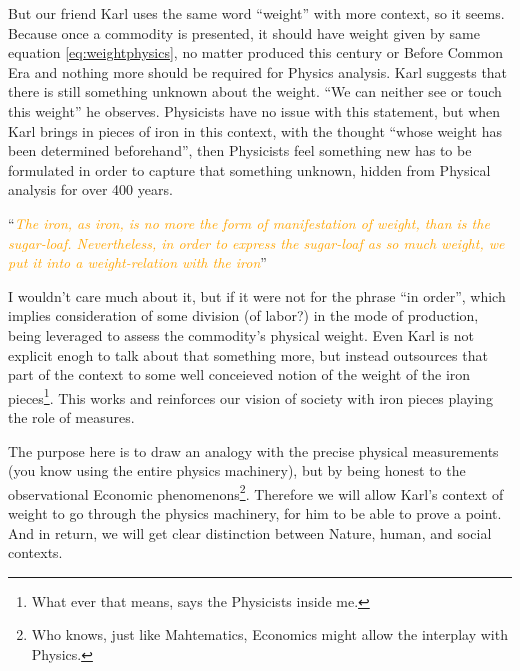 \documentclass[12pt]{extarticle}
\theoremstyle{definition}
\begin{document}
 But our friend Karl uses the same word ``weight'' with more context, so it seems.  Because once a commodity is presented, it should have weight given by same equation \ref{eq:weightphysics}, no matter produced this century or Before Common Era and nothing more should be required for Physics analysis.  Karl suggests that there is still something unknown about the weight.  ``We can neither see or touch this weight'' he observes.  Physicists have no issue with this statement, but when Karl brings in pieces of iron in this context, with the thought ``whose weight has been determined beforehand'', then Physicists feel something new has to be formulated in order to capture that something unknown, hidden from Physical analysis for over 400 years.

 ``\emph{\textcolor{orange}{The iron, as iron, is no more the form of manifestation of weight, than is the sugar-loaf. Nevertheless, in order to express the sugar-loaf as so much weight, we put it into a weight-relation with the iron}}''

 I wouldn't care much about it, but if it were not for the phrase ``in order'', which implies consideration of some division (of labor?) in the mode of production, being leveraged to assess the commodity's physical weight.  Even Karl is not explicit enogh to talk about that something more, but instead outsources that part of the context to some well conceieved notion of the weight of the iron pieces\footnote{What ever that means, says the Physicists inside me.}.  This works and reinforces our vision of society with iron pieces playing the role of measures.

 The purpose here is to draw an analogy with the precise physical measurements (you know using the entire physics machinery), but by being honest to the observational Economic phenomenons\footnote{Who knows, just like Mahtematics, Economics might allow the interplay with Physics.}.  Therefore we will allow Karl's context of weight to go through the physics machinery, for him to be able to prove a point.  And in return, we will get clear distinction between Nature, human, and social contexts.
\end{document}
